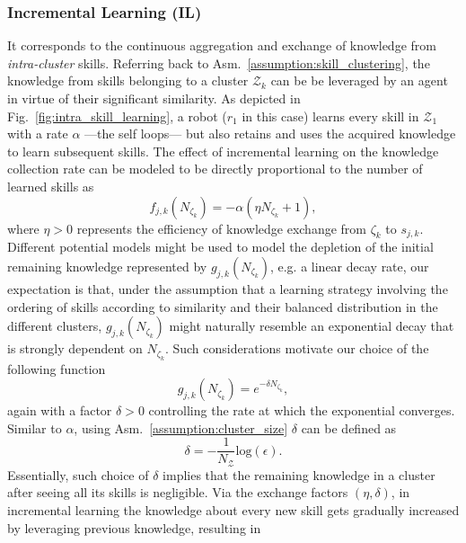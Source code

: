 \subsubsection{\textbf{Incremental Learning (IL)}}
It corresponds to the continuous aggregation and exchange of knowledge from \emph{intra-cluster} skills. Referring back to Asm.~\ref{assumption:skill_clustering}, the knowledge from skills belonging to a cluster ${\mathcal{Z}_k}$ can be be leveraged by an agent in virtue of their significant similarity. As depicted in Fig.~\ref{fig:intra_skill_learning}, a robot ($r_1$ in this case) learns every skill in $\mathcal{Z}_1$ with a rate $\alpha$ ---the self loops--- but also retains and uses the acquired knowledge to learn subsequent skills. The effect of incremental learning on the knowledge collection rate can be modeled to be directly proportional to the number of learned skills as
\begin{equation}\label{eq:f_function_incremental}
	f_{j,k}\left(N_{\zeta_k}\right) = -\alpha\left(\eta N_{\zeta_k} + 1 \right), 
\end{equation}
where $\eta>0$ represents the efficiency of knowledge exchange from $\zeta_k$ to $s_{j,k}$. Different potential models might be used to model the depletion of the initial remaining knowledge represented by $g_{j,k}\left(N_{\zeta_k}\right)$, e.g. a linear decay rate, our expectation is that, under the assumption that a learning strategy involving the ordering of skills according to similarity and their balanced distribution in the different clusters, $g_{j,k}\left(N_{\zeta_k}\right)$ might naturally resemble an exponential decay that is strongly dependent on $N_{\zeta_k}$. Such considerations motivate our choice of the following function
\begin{equation}\label{eq:g_function_incremental}
	g_{j,k}\left(N_{\zeta_k}\right) = e^{-\delta N_{\zeta_k}},
\end{equation}
again with a factor $\delta>0$ controlling the rate at which the exponential converges. Similar to $\alpha$, using Asm.~\ref{assumption:cluster_size} $\delta$ can be defined as 
\begin{equation}\label{eq:delta}
	\delta = -\frac{1}{N_\mathcal{Z}}\text{log}(\epsilon).
\end{equation}
Essentially, such choice of $\delta$ implies that the remaining knowledge in a cluster after seeing all its skills is negligible. Via the exchange factors $(\eta,\delta)$, in incremental learning the knowledge about every new skill gets gradually increased by leveraging previous knowledge, resulting in
